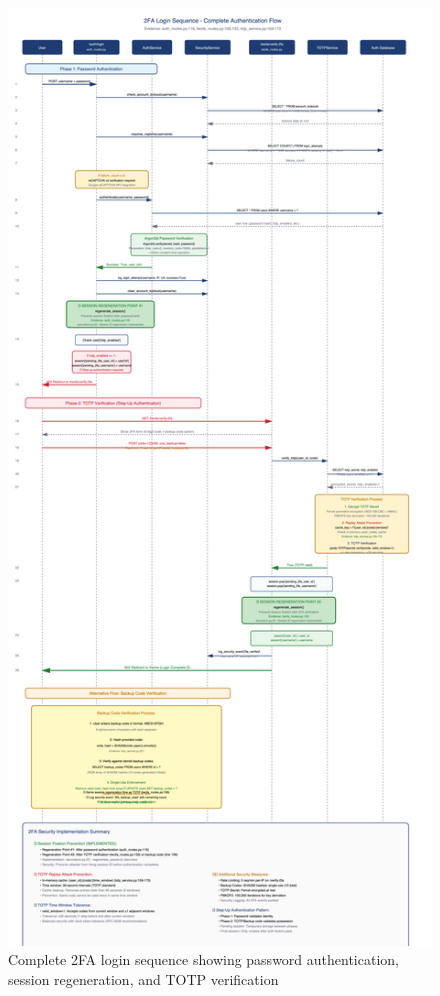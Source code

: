 \documentclass[12pt,a4paper]{article}
\begin{document}
\begin{figure}[H]
    \centering
    \includegraphics[width=\textwidth,height=0.85\textheight,keepaspectratio]{diagrams/5_2fa_login_sequence.png}
    \caption{Complete 2FA login sequence showing password authentication, session regeneration, and TOTP verification}
    \label{fig:2fa_flow}
\end{figure}
\end{document}
